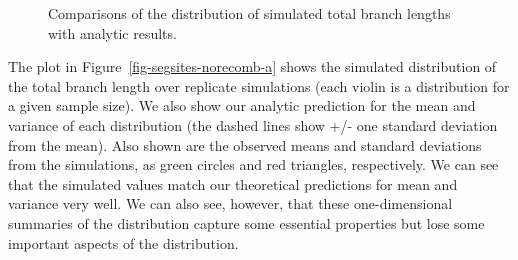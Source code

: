 \documentclass[graybox]{svmult}
\begin{document}
\begin{figure}[t]
\centering
{}
\qquad\qquad
{}
\caption{\label{fig-segsites-norecomb}
Comparisons of the distribution of simulated total branch lengths
with analytic results.
}
\end{figure}

    The plot in Figure~\ref{fig-segsites-norecomb-a} shows the simulated
distribution of the total branch length
over replicate simulations (each violin is a distribution for a given
sample size). We also show our analytic prediction for the mean and
variance of each distribution (the dashed lines show +/- one standard
deviation from the mean). Also shown are the observed means and standard
deviations from the simulations, as green circles and red triangles,
respectively. We can see that the simulated values match our theoretical
predictions for mean and variance very well. We can also see, however,
that these one-dimensional summaries of the distribution capture some
essential properties but lose some important aspects of the
distribution.
\end{document}
